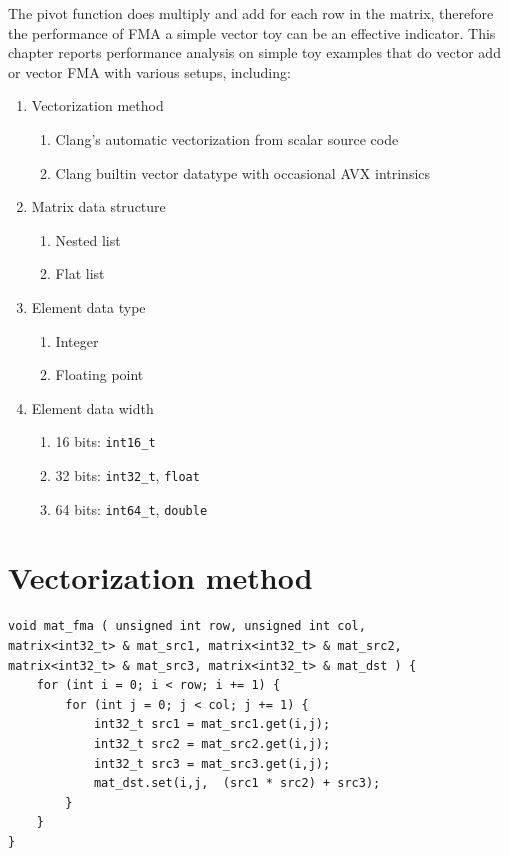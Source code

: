 \documentclass[logo,bsc,singlespacing,parskip]{infthesis}
\newenvironment{compactlist}
{ \begin{enumerate}
    \setlength{\itemsep}{0pt}
    \setlength{\parskip}{0pt}
    \setlength{\parsep}{0pt}     
}
{ \end{enumerate} }
\begin{document}
The pivot function does multiply and add for each row in the matrix, therefore
the performance of FMA a simple vector toy can be an effective indicator. This
chapter reports performance analysis on simple toy examples that do vector add
or vector FMA with various setups, including: 

\begin{enumerate} 
    \item Vectorization method 
        \begin{compactlist} 
            \item Clang's automatic vectorization from scalar source code
            \item Clang builtin vector datatype with occasional AVX intrinsics 
        \end{compactlist}
    \item Matrix data structure 
        \begin{compactlist} 
            \item Nested list
            \item Flat list
        \end{compactlist}
    \item Element data type 
        \begin{compactlist} 
            \item Integer
            \item Floating point
        \end{compactlist}
    \item Element data width
        \begin{compactlist} 
            \item 16 bits: \texttt{int16\_t}
            \item 32 bits: \texttt{int32\_t}, \texttt{float}
            \item 64 bits: \texttt{int64\_t}, \texttt{double}
        \end{compactlist}
\end{enumerate}

\section{Vectorization method}

\begin{verbatim}
void mat_fma ( unsigned int row, unsigned int col, 
matrix<int32_t> & mat_src1, matrix<int32_t> & mat_src2, matrix<int32_t> & mat_src3, matrix<int32_t> & mat_dst ) {
    for (int i = 0; i < row; i += 1) {
        for (int j = 0; j < col; j += 1) {
            int32_t src1 = mat_src1.get(i,j);
            int32_t src2 = mat_src2.get(i,j);
            int32_t src3 = mat_src3.get(i,j);
            mat_dst.set(i,j,  (src1 * src2) + src3);
        }
    }
}
\end{verbatim}
\end{document}
